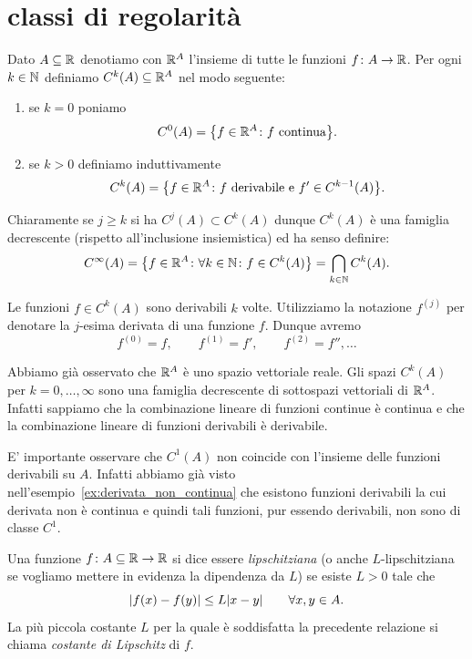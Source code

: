 \section{classi di regolarità}
%
\begin{definition}
\mymark{**}
Dato $A\subseteq {\mathbb R}$ denotiamo con ${\mathbb R}^A$ l'insieme di tutte le funzioni $f\colon A \to {\mathbb R}$.
Per ogni $k\in {\mathbb N}$ definiamo
$C^k(A) \subseteq {\mathbb R}^A$ nel modo seguente:
%
\begin{enumerate}
\item se $k=0$ poniamo
\[
  C^0(A) = {\left\{ f\in {\mathbb R}^A \colon \text{$f$ continua} \right\}}.
\]
\item
  se $k>0$ definiamo induttivamente
  \[
  C^{k}(A) = {\left\{ f\in {\mathbb R}^A \colon \text{$f$ derivabile e $f'\in C^{k-1}(A)$} \right\}}.
  \]
\end{enumerate}
Chiaramente se $j\ge k$ si ha $C^j(A) \subset C^k(A)$ dunque $C^k(A)$ è una famiglia decrescente (rispetto all'inclusione insiemistica) ed ha senso definire:
%
\[
  C^\infty(A) = {\left\{ f\in {\mathbb R}^A\colon \forall k \in {\mathbb N}\colon f\in C^k(A) \right\}} = \bigcap_{k\in {\mathbb N}} C^k(A).
\]

Le funzioni $f\in C^k(A)$ sono derivabili $k$ volte.
Utilizziamo la notazione $f^{(j)}$%
%
 per denotare la $j$-esima derivata
di una funzione $f$.
Dunque avremo
\[
  f^{(0)} = f, \qquad
  f^{(1)} = f', \qquad
  f^{(2)} = f'', \dots
\]
\end{definition}

Abbiamo già osservato che ${\mathbb R}^A$ è uno spazio vettoriale reale.
Gli spazi $C^k(A)$ per $k=0, \dots, \infty$ sono una famiglia decrescente di sottospazi vettoriali di ${\mathbb R}^A$.
Infatti sappiamo che la combinazione lineare di funzioni continue è continua e che la combinazione lineare di funzioni derivabili è derivabile.

E' importante osservare che $C^1(A)$ non coincide con l'insieme delle funzioni derivabili su $A$. Infatti abbiamo già visto nell'esempio~\ref{ex:derivata_non_continua} che esistono funzioni derivabili la cui derivata non è continua e quindi tali funzioni, pur essendo derivabili, non sono di classe $C^1$.

\begin{definition}
\mymark{**}
Una funzione $f\colon A\subseteq {\mathbb R} \to {\mathbb R}$ si dice essere \emph{lipschitziana} (o anche $L$-lipschitziana se vogliamo mettere in evidenza la dipendenza da $L$) se esiste $L>0$ tale che
\[
  {\left|f(x) - f(y)\right|} \le L {\left|x-y\right|}\qquad \forall x,y\in A.
\]
La più piccola costante $L$ per la quale è soddisfatta la precedente relazione si chiama \emph{costante di Lipschitz}
di $f$.
\end{definition}

